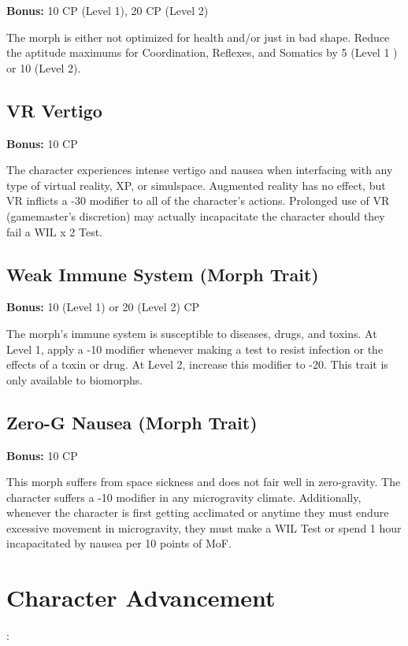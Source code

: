 \textbf{Bonus:} 10 CP (Level 1), 20 CP (Level 2) 

The morph is either not optimized for health and/or just in bad shape. Reduce the aptitude maximums for Coordination, Reflexes, and Somatics by 5 (Level 1 ) or 10 (Level 2). 

\subsection{VR Vertigo} \label{sec:traits-vr-vertigo} 

\textbf{Bonus:} 10 CP 

The character experiences intense vertigo and nausea when interfacing with any type of virtual reality, XP, or simulspace. Augmented reality has no effect, but VR inflicts a -30 modifier to all of the character’s actions. Prolonged use of VR (gamemaster’s discretion) may actually incapacitate the character should they fail a WIL x 2 Test. 

\subsection{Weak Immune System (Morph Trait)} \label{sec:traits-weak-immune-system} 

\textbf{Bonus:} 10 (Level 1) or 20 (Level 2) CP 

The morph’s immune system is susceptible to diseases, drugs, and toxins. At Level 1, apply a -10 modifier whenever making a test to resist infection or the effects of a toxin or drug. At Level 2, increase this modifier to -20. This trait is only available to biomorphs. 

\subsection{Zero-G Nausea (Morph Trait)} \label{sec:traits-zero-g-nausea} 

\textbf{Bonus:} 10 CP 

This morph suffers from space sickness and does not fair well in zero-gravity. The character suffers a -10 modifier in any microgravity climate. Additionally, whenever the character is first getting acclimated or anytime they must endure excessive movement in microgravity, they must make a WIL Test or spend 1 hour incapacitated by nausea per 10 points of MoF. 

\section{Character Advancement}: \label{sec:character-advancement} 

